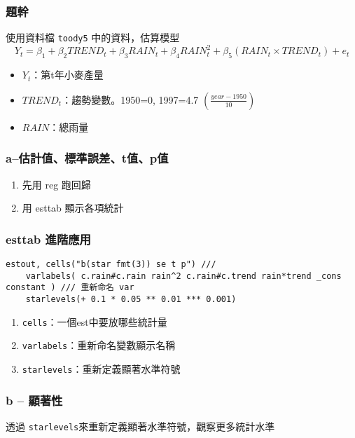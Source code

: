 \begin{frame}
    \frametitle{題幹}

    使用資料檔 \texttt{toody5} 中的資料，估算模型
    \begin{equation}
        Y_t = \beta_1 + \beta_2 TREND_t + \beta_3 RAIN_t + \beta_4 RAIN_t^2 + \beta_5 (RAIN_t \times TREND_t) + e_t 
    \end{equation}

    \begin{itemize}
        \item $Y_t$：第t年小麥產量
        \item $TREND_t$：趨勢變數。1950=0, 1997=4.7 $(\frac{year - 1950}{10})$
        \item $RAIN$：總雨量
    \end{itemize}
\end{frame}

\begin{frame}
    \frametitle{a--估計值、標準誤差、t值、p值}
        \begin{enumerate}
            \item 先用 reg 跑回歸
            \item 用 esttab 顯示各項統計
        \end{enumerate}
\end{frame}

\begin{frame}[fragile]
    \frametitle{esttab 進階應用}
    \begin{lstlisting}
estout, cells("b(star fmt(3)) se t p") ///
    varlabels( c.rain#c.rain rain^2 c.rain#c.trend rain*trend _cons constant ) /// 重新命名 var
    starlevels(+ 0.1 * 0.05 ** 0.01 *** 0.001)\end{lstlisting}
    \vfill
    \begin{enumerate}
        \item \texttt{cells}：一個est中要放哪些統計量
        \item \texttt{varlabels}：重新命名變數顯示名稱
        \item \texttt{starlevels}：重新定義顯著水準符號
    \end{enumerate}
\end{frame}

\begin{frame}
    \frametitle{b -- 顯著性}
    透過 \texttt{starlevels}來重新定義顯著水準符號，觀察更多統計水準
\end{frame}

